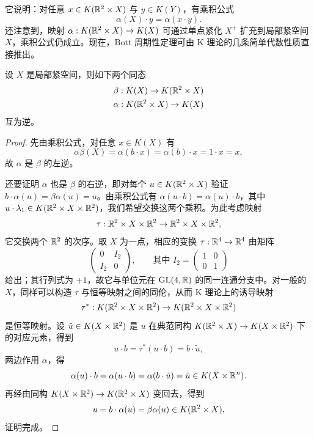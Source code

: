 它说明：对任意 $x\in K(\mathbb{R}^2\times X)$ 与 $y\in K(Y)$，有乘积公式
\[
\alpha(X)\cdot y=\alpha(x\cdot y).
\]
还注意到，映射 $\alpha:K(\mathbb{R}^2\times X)\to K(X)$ 可通过单点紧化 $X^+$ 扩充到局部紧空间 $X$，乘积公式仍成立。现在，Bott 周期性定理可由 K 理论的几条简单代数性质直接推出。

\begin{theorem}
设 $X$ 是局部紧空间，则如下两个同态
\[
\begin{gathered}
\beta:K(X)\to K(\mathbb{R}^2\times X)\\
\alpha:K(\mathbb{R}^2\times X)\to K(X)
\end{gathered}
\]
互为逆。
\end{theorem}

\begin{proof}
先由乘积公式，对任意 $x\in K(X)$ 有
\[
\alpha\beta(X)=\alpha(b\cdot x)=\alpha(b)\cdot x=1\cdot x=x,
\]
故 $\alpha$ 是 $\beta$ 的左逆。

还要证明 $\alpha$ 也是 $\beta$ 的右逆，即对每个 $u\in K(\mathbb{R}^2\times X)$ 验证 $b\cdot\alpha(u)=\beta\alpha(u)=u$。由乘积公式有 $\alpha(u\cdot b)=\alpha(u)\cdot b$，其中 $u\cdot\lambda_1\in K(\mathbb{R}^2\times X\times\mathbb{R}^2)$，我们希望交换这两个乘积。为此考虑映射
\[
\tau:\mathbb{R}^2\times X\times\mathbb{R}^2\to\mathbb{R}^2\times X\times\mathbb{R}^2,
\]
它交换两个 $\mathbb{R}^2$ 的次序。取 $X$ 为一点，相应的变换 $\tau:\mathbb{R}^4\to\mathbb{R}^4$ 由矩阵
\[
\begin{pmatrix}0&I_2\\I_2&0\end{pmatrix},\qquad\text{其中 } I_2=\begin{pmatrix}1&0\\0&1\end{pmatrix}
\]
给出；其行列式为 $+1$，故它与单位元在 $\operatorname{GL}(4,\mathbb{R})$ 的同一连通分支中。对一般的 $X$，同样可以构造 $\tau$ 与恒等映射之间的同伦，从而 K 理论上的诱导映射
\[
\tau^*:K(\mathbb{R}^2\times X\times\mathbb{R}^2)\to K(\mathbb{R}^2\times X\times\mathbb{R}^2)
\]
是恒等映射。设 $\tilde u\in K(X\times\mathbb{R}^2)$ 是 $u$ 在典范同构 $K(\mathbb{R}^2\times X)\to K(X\times\mathbb{R}^2)$ 下的对应元素，得到
\[
u\cdot b=\tau^*(u\cdot b)=b\cdot\tilde u,
\]
两边作用 $\alpha$，得
\[
\alpha(u)\cdot b=\alpha(u\cdot b)=\alpha(b\cdot\tilde u)=\tilde u\in K(X\times\mathbb{R}^n).
\]
再经由同构 $K(X\times\mathbb{R}^2)\to K(\mathbb{R}^2\times X)$ 变回去，得到
\[
u=b\cdot\alpha(u)=\beta\alpha(u)\in K(\mathbb{R}^2\times X),
\]
证明完成。
\end{proof}



